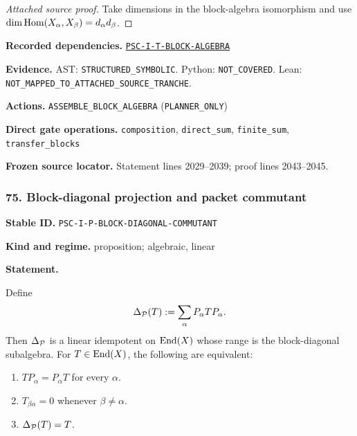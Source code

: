 \documentclass[a4paper,11pt]{article}
\newcommand{\field}[2]{\noindent\textbf{#1.} #2\par}
\begin{document}
\begin{proof}[Attached source proof]
Take dimensions in the block-algebra isomorphism and use $\dim\operatorname{Hom}(X_\alpha,X_\beta)=d_\alpha d_\beta$.
\end{proof}
\field{Recorded dependencies}{\hyperref[rec:PSC-I-T-BLOCK-ALGEBRA]{\nolinkurl{PSC-I-T-BLOCK-ALGEBRA}}}
\field{Evidence}{AST: \nolinkurl{STRUCTURED_SYMBOLIC}. Python: \nolinkurl{NOT_COVERED}. Lean: \nolinkurl{NOT_MAPPED_TO_ATTACHED_SOURCE_TRANCHE}.}
\field{Actions}{\nolinkurl{ASSEMBLE_BLOCK_ALGEBRA} (\nolinkurl{PLANNER_ONLY})}
\field{Direct gate operations}{\nolinkurl{composition}, \nolinkurl{direct_sum}, \nolinkurl{finite_sum}, \nolinkurl{transfer_blocks}}
\field{Frozen source locator}{Statement lines 2029--2039; proof lines 2043--2045.}
\subsubsection*{75. Block-diagonal projection and packet commutant}
\label{rec:PSC-I-P-BLOCK-DIAGONAL-COMMUTANT}
\field{Stable ID}{\nolinkurl{PSC-I-P-BLOCK-DIAGONAL-COMMUTANT}}
\field{Kind and regime}{proposition; algebraic, linear}
\textbf{Statement.}\par
Define
\[
\Delta_{\mathcal P}(T):=\sum_{\alpha}P_\alpha TP_\alpha.
\]
Then $\Delta_{\mathcal P}$ is a linear idempotent on $\operatorname{End}(X)$ whose range is the block-diagonal subalgebra.  For $T\in\operatorname{End}(X)$, the following are equivalent:
\begin{enumerate}[label=(\roman*)]
\item $TP_\alpha=P_\alpha T$ for every $\alpha$.
\item $T_{\beta\alpha}=0$ whenever $\beta\neq\alpha$.
\item $\Delta_{\mathcal P}(T)=T$.
\end{enumerate}
\end{document}
